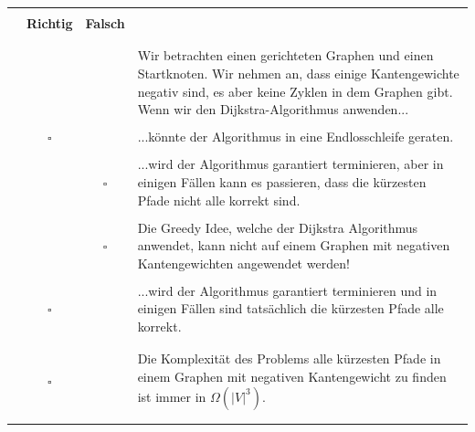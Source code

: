 \documentclass{article}
\newcommand{\checkedbox}[0]{\makebox[0pt][l]{$\square$}\raisebox{.15ex}{\hspace{0.1em}$\checkmark$}}
\begin{document}
\begin{table}[]
    \centering
    \begin{tabular}{ | p{1cm} | c c | p{13cm} |} \hline
    & & & \\
     & \textbf{Richtig} & \textbf{Falsch} &  \\ & & & \\ \hline \hline  & & & \\
         & & &  Wir betrachten einen gerichteten Graphen und einen Startknoten. Wir nehmen an, dass einige Kantengewichte negativ sind, es aber keine Zyklen in dem Graphen gibt. Wenn wir den\index{Dijkstra} Dijkstra-Algorithmus anwenden... \\ & & & \\
         
     \cite{probeklausur24}\cite{probeklausur21} & $\square$ &  \checkedbox & ...könnte der Algorithmus in eine Endlosschleife geraten. \\ & & & \\
     
     \cite{probeklausur24}& \checkedbox &  $\square$  & ...wird der Algorithmus garantiert terminieren, aber in einigen Fällen kann es passieren, dass die kürzesten Pfade nicht alle korrekt sind. \\ & & & \\
     
     \cite{probeklausur21} & \checkedbox &  $\square$  & Die Greedy Idee, welche der Dijkstra\index{Dijkstra} Algorithmus anwendet, kann nicht auf einem Graphen mit negativen Kantengewichten angewendet werden! \\ & & & \\
      
     \cite{probeklausur24} \cite{probeklausur21} & $\square$ &  \checkedbox  & ...wird der Algorithmus garantiert terminieren und in einigen Fällen sind tatsächlich die kürzesten Pfade alle korrekt.\\ & & & \\ \hline \hline & & & \\
     
     \cite{hauptklausur21} & $\square$ &  \checkedbox  & Die Komplexität des Problems alle kürzesten Pfade\index{Pfad!kürzeste} in einem Graphen mit negativen Kantengewicht\index{Kantengewicht!negatives} zu finden ist immer in $\Omega(|V|^3)$. \\ & & & \\ \hline \hline & & & \\ 
     

\end{tabular}
\end{table}
\end{document}
